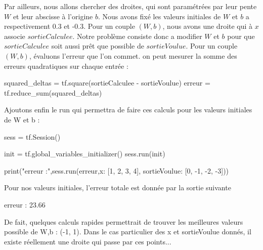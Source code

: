 \documentclass[a4paper,11pt]{book}
\begin{document}
Par ailleurs, nous allons chercher des droites, qui sont paramétrées par leur pente $W$ et leur abscisse à l'origine $b$. Nous avons fixé les valeurs initiales de $W$ et $b$ a respectivement 0.3 et -0.3. Pour un couple $(W,b)$, nous avons une droite qui à $x$ associe $sortieCalculee$.
Notre problème consiste donc a modifier $W$ et $b$ pour que $sortieCalculee$ soit aussi prêt que possible de $sortieVoulue$.
Pour un couple $(W,b)$, évaluons l'erreur que l'on commet. on peut mesurer la somme des erreurs quadratiques sur chaque entrée :

\begin{mypython}
squared_deltas = tf.square(sortieCalculee - sortieVoulue)
erreur = tf.reduce_sum(squared_deltas)
\end{mypython}
Ajoutons enfin le run qui permettra de faire ces calculs pour les valeurs initiales de W et b :
\begin{mypython}
sess = tf.Session()

init = tf.global_variables_initializer()
sess.run(init)

print("erreur :",sess.run(erreur,{x: [1, 2, 3, 4], sortieVoulue: [0, -1, -2, -3]}))
\end{mypython}
Pour nos valeurs initiales, l'erreur totale est donnée par la sortie suivante
\begin{myoutput}
erreur : 23.66
\end{myoutput}
De fait, quelques calculs rapides permettrait de trouver les meilleures valeurs possible de W,b : (-1, 1). Dans le cas particulier des x et sortieVoulue donnés, il existe réellement une droite qui passe par ces points...
\end{document}
